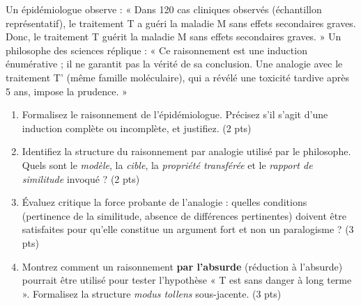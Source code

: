 \documentclass[11pt]{article}
\begin{document}
\begin{exercice}
Un épidémiologue observe : « Dans 120 cas cliniques observés (échantillon représentatif), le traitement T a guéri la maladie M sans effets secondaires graves. Donc, le traitement T guérit la maladie M sans effets secondaires graves. » Un philosophe des sciences réplique : « Ce raisonnement est une induction énumérative ; il ne garantit pas la vérité de sa conclusion. Une analogie avec le traitement T' (même famille moléculaire), qui a révélé une toxicité tardive après 5 ans, impose la prudence. »
\begin{enumerate}
    \item Formalisez le raisonnement de l'épidémiologue. Précisez s'il s'agit d'une induction complète ou incomplète, et justifiez. (2 pts)
    \item Identifiez la structure du raisonnement par analogie utilisé par le philosophe. Quels sont le \textit{modèle}, la \textit{cible}, la \textit{propriété transférée} et le \textit{rapport de similitude} invoqué ? (2 pts)
    \item Évaluez critique la force probante de l'analogie : quelles conditions (pertinence de la similitude, absence de différences pertinentes) doivent être satisfaites pour qu'elle constitue un argument fort et non un paralogisme ? (3 pts)
    \item Montrez comment un raisonnement \textbf{par l'absurde} (réduction à l'absurde) pourrait être utilisé pour tester l'hypothèse « T est sans danger à long terme ». Formalisez la structure \textit{modus tollens} sous-jacente. (3 pts)
\end{enumerate}
\end{exercice}
\end{document}
